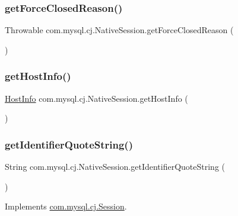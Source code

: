 \subsubsection{\texorpdfstring{get\+Force\+Closed\+Reason()}{getForceClosedReason()}}
{\footnotesize\ttfamily Throwable com.\+mysql.\+cj.\+Native\+Session.\+get\+Force\+Closed\+Reason (\begin{DoxyParamCaption}{ }\end{DoxyParamCaption})}

\mbox{\label{classcom_1_1mysql_1_1cj_1_1_native_session_a9a6129d65239775a738e640addb8d9db}} 
\subsubsection{\texorpdfstring{get\+Host\+Info()}{getHostInfo()}}
{\footnotesize\ttfamily \mbox{\hyperlink{classcom_1_1mysql_1_1cj_1_1conf_1_1_host_info}{Host\+Info}} com.\+mysql.\+cj.\+Native\+Session.\+get\+Host\+Info (\begin{DoxyParamCaption}{ }\end{DoxyParamCaption})}

\mbox{\label{classcom_1_1mysql_1_1cj_1_1_native_session_af85c1c114ea3ef2ab2d588cd178512cf}} 
\subsubsection{\texorpdfstring{get\+Identifier\+Quote\+String()}{getIdentifierQuoteString()}}
{\footnotesize\ttfamily String com.\+mysql.\+cj.\+Native\+Session.\+get\+Identifier\+Quote\+String (\begin{DoxyParamCaption}{ }\end{DoxyParamCaption})}



Implements \mbox{\hyperlink{interfacecom_1_1mysql_1_1cj_1_1_session_a5e11ee96316b575dcdf04270c90cc783}{com.\+mysql.\+cj.\+Session}}.

